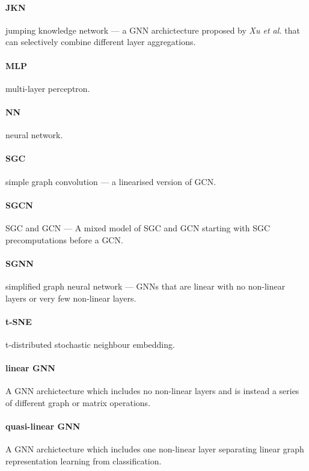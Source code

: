 \paragraph{JKN}
jumping knowledge network --- a GNN archictecture proposed by \textit{Xu et al.}\cite{xu2018representation} that can selectively combine different layer aggregations.

\paragraph{MLP}
multi-layer perceptron.

\paragraph{NN}
neural network.

\paragraph{SGC}
simple graph convolution --- a linearised version of GCN.

\paragraph{SGCN}
SGC and GCN --- A mixed model of SGC and GCN starting with SGC precomputations before a GCN.

\paragraph{SGNN}
simplified graph neural network --- GNNs that are linear with no non-linear layers or very few non-linear layers.

\paragraph{t-SNE}
t-distributed stochastic neighbour embedding.

\paragraph{linear GNN}
A GNN archictecture which includes no non-linear layers and is instead a series of different graph or matrix operations.

\paragraph{quasi-linear GNN}
A GNN archictecture which includes one non-linear layer separating linear graph representation learning from classification.

